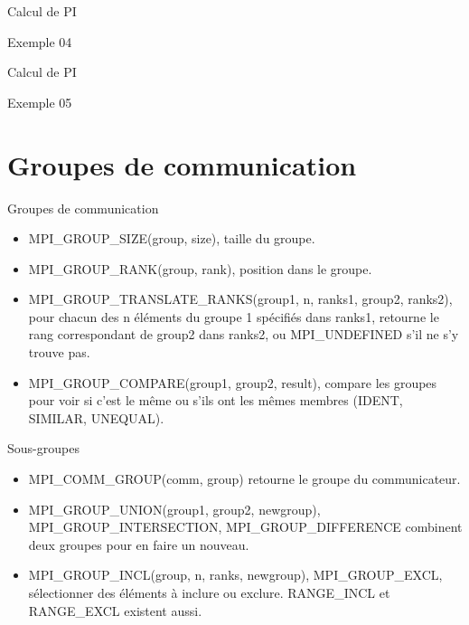 \documentclass[10pt]{beamer}
\begin{document}
\begin{frame}[fragile]{Calcul de PI}

Exemple 04

\end{frame}

\begin{frame}[fragile]{Calcul de PI}

Exemple 05

\end{frame}

\section{Groupes de communication}

\begin{frame}{Groupes de communication}

  \begin{itemize}
    \item MPI\_GROUP\_SIZE(group, size), taille du groupe.

    \item MPI\_GROUP\_RANK(group, rank), position dans le groupe.

    \item MPI\_GROUP\_TRANSLATE\_RANKS(group1, n, ranks1, group2, ranks2), pour chacun des n éléments du groupe 1 spécifiés dans ranks1, retourne le rang correspondant de group2 dans ranks2, ou MPI\_UNDEFINED s'il ne s'y trouve pas.

    \item MPI\_GROUP\_COMPARE(group1, group2, result), compare les groupes pour voir si c'est le même ou s'ils ont les mêmes membres (IDENT, SIMILAR, UNEQUAL).
  \end{itemize}
\end{frame}

\begin{frame}{Sous-groupes}

  \begin{itemize}
    \item MPI\_COMM\_GROUP(comm, group) retourne le groupe du communicateur.

    \item MPI\_GROUP\_UNION(group1, group2, newgroup), MPI\_GROUP\_INTERSECTION, MPI\_GROUP\_DIFFERENCE combinent deux groupes pour en faire un nouveau.

    \item MPI\_GROUP\_INCL(group, n, ranks, newgroup), MPI\_GROUP\_EXCL, sélectionner des éléments à inclure ou exclure. RANGE\_INCL et RANGE\_EXCL existent aussi.
  \end{itemize}
\end{frame}
\end{document}
